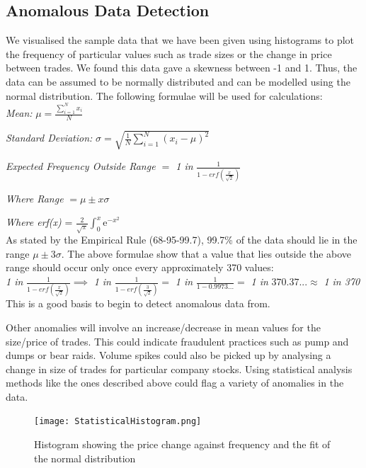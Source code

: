 \documentclass[11pt, oneside, a4paper]{article}
\begin{document}
\subsection{Anomalous Data Detection}

We visualised the sample data that we have been given using histograms to plot
the frequency of particular values such as trade sizes or the change in price
between trades. We found this data gave a skewness between -1 and 1. Thus, the
data can be assumed to be normally distributed and can be modelled using the
normal distribution. The following formulae will be used for calculations:\\

\textit{Mean: } $\mu = \frac{\sum_{i=1}^{N} x_{i}}{N}$

\textit{Standard Deviation: } $\sigma = \sqrt{\frac{1}{N}\sum_{i=1}^{N}(x_{i} - \mu)^2}$

\textit{Expected Frequency Outside Range $=$ 1 in }$\frac{1}{1-erf(\frac{x}{\sqrt{2}})}$

\textit{Where Range }$ = \mu \pm x\sigma$

\textit{Where erf(x) } = $\frac{2}{\sqrt{\pi}}\int_0^x\mathrm{e}^{-x^2}$\\

As stated by the Empirical Rule (68-95-99.7), 99.7\% of the data should lie in the
range $\mu \pm 3\sigma$. The above formulae show that a value that lies outside
the above range should occur only once every approximately 370 values:\\

\textit{1 in }$\frac{1}{1-erf(\frac{x}{\sqrt{2}})} \implies $ \textit{1 in }$\frac{1}{1-erf(\frac{3}{\sqrt{2}})} = $ \textit{1 in }$\frac{1}{1-0.9973...} = $ \textit{1 in }$370.37... \approx $ \textit{1 in 370} \\

This is a good basis to begin to detect anomalous data from.

Other anomalies will involve an increase/decrease in mean values for the size/price
of trades. This could indicate fraudulent practices such as pump and dumps or bear
raids. Volume spikes could also be picked up by analysing a change in size of trades
for particular company stocks. Using statistical analysis methods like the ones
described above could flag a variety of anomalies in the data.

\begin{figure}[h]
	\centering
		\texttt{[image: StatisticalHistogram.png]}
	\caption{Histogram showing the price change against frequency and the fit of the normal distribution}
	\label{StatisticalHistogram}
\end{figure}
\end{document}
